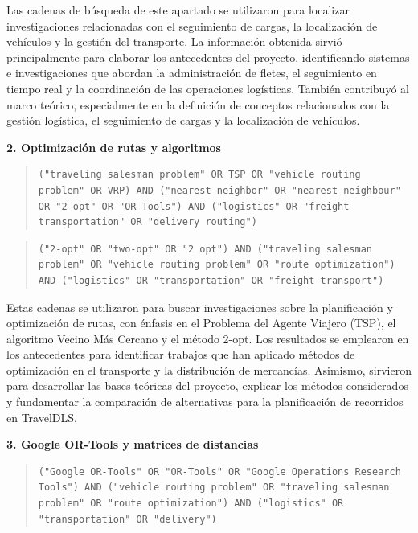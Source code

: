 Las cadenas de búsqueda de este apartado se utilizaron para localizar investigaciones relacionadas con el seguimiento de cargas, la localización de vehículos y la gestión del transporte. La información obtenida sirvió principalmente para elaborar los antecedentes del proyecto, identificando sistemas e investigaciones que abordan la administración de fletes, el seguimiento en tiempo real y la coordinación de las operaciones logísticas. También contribuyó al marco teórico, especialmente en la definición de conceptos relacionados con la gestión logística, el seguimiento de cargas y la localización de vehículos.

\textbf{2. Optimización de rutas y algoritmos}

\begin{quote}
	\begin{lstlisting}[style=cadenas]
		("traveling salesman problem" OR TSP OR "vehicle routing problem" OR VRP) AND ("nearest neighbor" OR "nearest neighbour" OR "2-opt" OR "OR-Tools") AND ("logistics" OR "freight transportation" OR "delivery routing")
	\end{lstlisting}
\end{quote}


\begin{quote}
	\begin{lstlisting}[style=cadenas]
		("2-opt" OR "two-opt" OR "2 opt") AND ("traveling salesman problem" OR "vehicle routing problem" OR "route optimization") AND ("logistics" OR "transportation" OR "freight transport")
	\end{lstlisting}
\end{quote}
Estas cadenas se utilizaron para buscar investigaciones sobre la planificación y optimización de rutas, con énfasis en el Problema del Agente Viajero (TSP), el algoritmo Vecino Más Cercano y el método 2-opt. Los resultados se emplearon en los antecedentes para identificar trabajos que han aplicado métodos de optimización en el transporte y la distribución de mercancías. Asimismo, sirvieron para desarrollar las bases teóricas del proyecto, explicar los métodos considerados y fundamentar la comparación de alternativas para la planificación de recorridos en TravelDLS.

\textbf{3. Google OR-Tools y matrices de distancias}

\begin{quote}
	\begin{lstlisting}[style=cadenas]
		("Google OR-Tools" OR "OR-Tools" OR "Google Operations Research Tools") AND ("vehicle routing problem" OR "traveling salesman problem" OR "route optimization") AND ("logistics" OR "transportation" OR "delivery")
	\end{lstlisting}
\end{quote}


